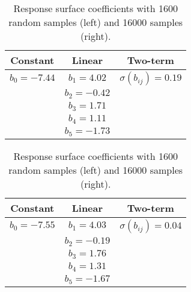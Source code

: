 \begin{table}[h!]
	\centering
	\begin{tabular}{c|c|c}
		Constant & Linear & Two-term \\ \hline
		$b_0 = -7.44$ & $b_1 = 4.02$ & $\sigma(b_{ij}) = 0.19$ \\
		& $b_2 = -0.42$ &  \\
		& $b_3 = 1.71$ &  \\
		& $b_4 = 1.11$ &  \\
		& $b_5 = -1.73$ &  \\
	\end{tabular}
	\quad\quad\quad
	\begin{tabular}{c|c|c}
		Constant & Linear & Two-term \\ \hline
		$b_0 = -7.55$ & $b_1 = 4.03$ & $\sigma(b_{ij}) = 0.04$ \\
		& $b_2 = -0.19$ &  \\
		& $b_3 = 1.76$ &  \\
		& $b_4 = 1.31$ &  \\
		& $b_5 = -1.67$ &  \\
	\end{tabular}
	\caption{Response surface coefficients with 1600 random samples (left) and 16000 samples (right).}
	\label{tab:monty_16000}
\end{table}

